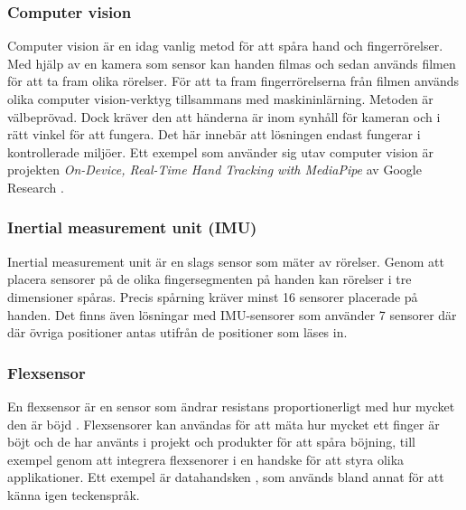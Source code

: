 \documentclass[a4paper]{article}
\begin{document}
\begin{sloppypar}
  \subsubsection{Computer vision}
  Computer vision är en idag vanlig metod för att spåra hand och fingerrörelser. Med hjälp av en kamera som sensor kan
  handen filmas och sedan används filmen för att ta fram olika rörelser. För att ta fram fingerrörelserna från
  filmen används olika computer vision-verktyg tillsammans med maskininlärning. Metoden är välbeprövad. Dock kräver den att
  händerna är inom synhåll för kameran och i rätt vinkel för att fungera. Det här innebär att lösningen endast fungerar
  i kontrollerade miljöer. Ett exempel som använder sig utav computer vision är projekten \textit{On-Device, Real-Time Hand Tracking with MediaPipe}
  av Google Research \cite{google:Hand_Tracking}.

  \subsubsection{Inertial measurement unit (IMU)}
  Inertial measurement unit är en slags sensor som mäter av rörelser. Genom att
  placera sensorer på de olika fingersegmenten på handen kan rörelser i tre
  dimensioner spåras. Precis spårning kräver minst 16 sensorer placerade på
  handen. Det finns även lösningar med IMU-sensorer som använder 7 sensorer
  där där övriga positioner antas utifrån de positioner som läses in.\cite{wiki:Finger_tracking}

  \subsubsection{Flexsensor}
  En flexsensor är en sensor som ändrar resistans proportionerligt med hur mycket den är böjd \cite{wiki:Flex_sensor}.
  Flexsensorer kan användas för att mäta hur mycket ett finger är böjt och de har använts i projekt och produkter för att spåra böjning, till exempel genom att integrera flexsenorer i en handske för att styra olika applikationer. Ett exempel är datahandsken \cite{wiki:Wired_glove}, som används bland annat för att känna igen teckenspråk.


\end{sloppypar}
\end{document}
